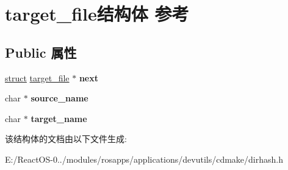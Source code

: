 \hypertarget{structtarget__file}{}\section{target\+\_\+file结构体 参考}
\label{structtarget__file}
\subsection*{Public 属性}
\begin{DoxyCompactItemize}
\item 
\mbox{\label{structtarget__file_a4b7f25fa2ed5b8b35a079a836d90c7ff}} 
\hyperlink{interfacestruct}{struct} \hyperlink{structtarget__file}{target\+\_\+file} $\ast$ {\bfseries next}
\item 
\mbox{\label{structtarget__file_a31720c4d18d5e0490b3ff26e14bce586}} 
char $\ast$ {\bfseries source\+\_\+name}
\item 
\mbox{\label{structtarget__file_a95d73b903726560f919f5a7ce3f42eca}} 
char $\ast$ {\bfseries target\+\_\+name}
\end{DoxyCompactItemize}


该结构体的文档由以下文件生成\+:\begin{DoxyCompactItemize}
\item 
E\+:/\+React\+O\+S-\/0../modules/rosapps/applications/devutils/cdmake/dirhash.\+h\end{DoxyCompactItemize}
